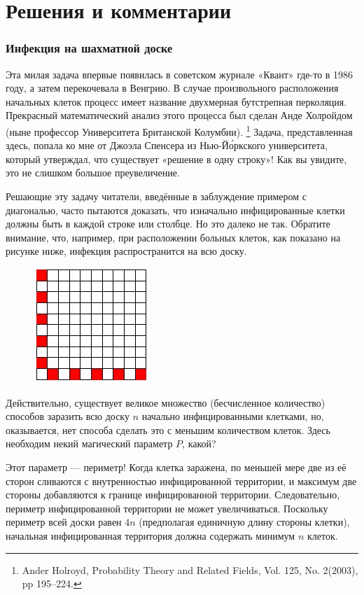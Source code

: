 ﻿\section*{Решения и комментарии}

\subsubsection*{Инфекция на шахматной доске}%

Эта милая задача впервые появилась в советском журнале «Квант» где-то в 1986 году, а затем перекочевала в Венгрию.
В случае произвольного расположения начальных клеток процесс имеет название двухмерная бутстрепная перколяция.
Прекрасный математический анализ этого процесса был сделан Анде Холройдом (ныне профессор Университета Британской Колумбии).%
\footnote{Ander Holroyd, Probability Theory and Related Fields, Vol. 125, No. 2(2003), pp 195--224.}
Задача, представленная здесь, попала ко мне от Джоэла Спенсера %
из Нью-Йо́ркского университета, который утверждал, что существует «решение в одну строку»!
Как вы увидите, это не слишком большое преувеличение.

Решающие эту задачу читатели, введённые в заблуждение примером с диагональю, часто пытаются доказать, что изначально инфицированные клетки должны быть в каждой строке или столбце.
Но это далеко не так.
Обратите внимание, что, например, при расположении больных клеток, как показано на рисунке ниже, инфекция распространится на всю доску.

\begin{figure}[h!]
\centering
\includegraphics[scale=1.5]{Figs/Algorithms/sick}
\end{figure}

Действительно, существует великое множество (бесчисленное количество) способов заразить всю доску $n$ начально инфицированными клетками, но, оказывается, нет способа сделать это с меньшим количеством клеток.
Здесь необходим некий магический параметр $P$, какой?

Этот параметр --- периметр! Когда клетка заражена, по меньшей мере две из её сторон сливаются с внутренностью инфицированной территории, и максимум две стороны добавляются к границе инфицированной территории.
Следовательно, периметр инфицированной территории не может увеличиваться.
Поскольку периметр всей доски равен $4n$ (предполагая единичную длину стороны клетки), начальная инфицированная территория должна содержать минимум $n$ клеток.
\heart

